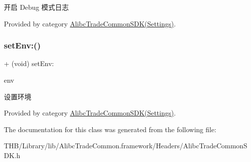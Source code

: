 开启 Debug 模式日志 

Provided by category \mbox{\hyperlink{category_alibc_trade_common_s_d_k_07_settings_08_a078b422151a1f58252df135495ca6672}{Alibc\+Trade\+Common\+S\+D\+K(\+Settings)}}.

\mbox{\label{interface_alibc_trade_common_s_d_k_a780956aef5009a4b6fcbe3fc9f63f598}} 
\subsubsection{\texorpdfstring{set\+Env\+:()}{setEnv:()}}
{\footnotesize\ttfamily + (void) set\+Env\+: \begin{DoxyParamCaption}\item[{(Alibc\+Environment)}]{env }\end{DoxyParamCaption}}

设置环境 

Provided by category \mbox{\hyperlink{category_alibc_trade_common_s_d_k_07_settings_08_a780956aef5009a4b6fcbe3fc9f63f598}{Alibc\+Trade\+Common\+S\+D\+K(\+Settings)}}.



The documentation for this class was generated from the following file\+:\begin{DoxyCompactItemize}
\item 
T\+H\+B/\+Library/lib/\+Alibc\+Trade\+Common.\+framework/\+Headers/Alibc\+Trade\+Common\+S\+D\+K.\+h\end{DoxyCompactItemize}

